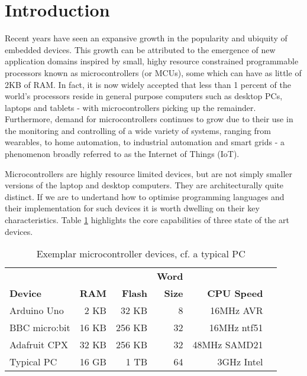 \section{Introduction}
\label{sec:intro}

Recent years have seen an expansive growth in the popularity and ubiquity of embedded devices. 
This growth can be attributed to the emergence of new application domains inspired by small, 
highy resource constrained programmable processors known as microcontrollers (or MCUs), 
some which can have as little of 2KB of RAM. In fact, it is now 
widely accepted  that less than 1 percent of the world's processors reside in general purpose 
computers such as desktop PCs, laptops and tablets - with microcontrollers picking up the remainder.
Furthermore, demand for microcontrollers continues to grow due to their use in the monitoring and 
controlling of a wide variety of systems, ranging from wearables, to home automation, to 
industrial automation and smart grids - a phenomenon broadly referred to as the Internet of Things (IoT).

Microcontrollers are highly resource limited devices, but are not simply smaller versions of the laptop 
and desktop computers. They are architecturally quite distinct. If we are to undertand how to optimise 
programming languages and their implementation for such devices it is worth dwelling on their key characteristics. 
Table \ref{table:devices} highlights the core capabilities of three state of the art devices. 

\begin{table}[]
    \centering
    \begin{tabular}{|l|r|r|r|r|r|}
    \hline
                           &          &              & \bf{Word}  &                 \\
    \bf{Device}            & \bf{RAM} & \bf{Flash}   & \bf{Size}  & \bf{CPU Speed}  \\ \hline
    Arduino Uno            & 2 KB       & 32 KB      & 8          & 16MHz AVR       \\ \hline
    BBC micro:bit          & 16 KB      & 256 KB     & 32         & 16MHz ntf51     \\ \hline
    Adafruit CPX           & 32 KB      & 256 KB     & 32         & 48MHz SAMD21    \\ \hline
    Typical PC             & 16 GB      & 1 TB       & 64         & 3GHz Intel      \\ \hline
    \end{tabular}
    \caption{\label{table:devices}Exemplar microcontroller devices, cf. a typical PC}
    \end{table}

